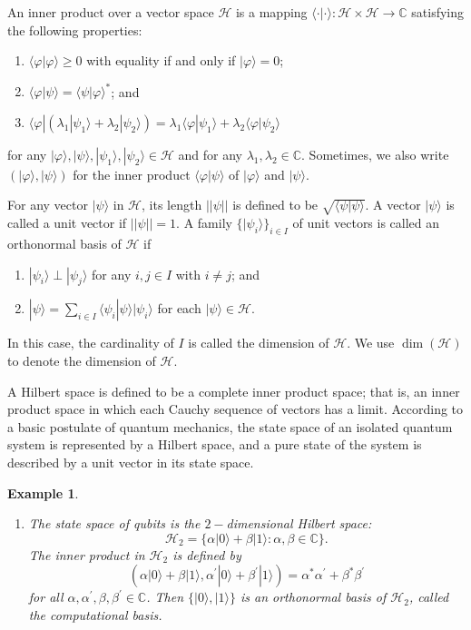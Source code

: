\documentclass[conference,compsoc, 10pt]{IEEEtran}
\newtheorem{example}{Example}[section]
\newcommand {\cH } {{\mathcal{H}}}
\begin{document}
\begin{appendices}
		An inner product over a vector space $\mathcal{H}$ is a mapping
		$\langle\cdot|\cdot\rangle:\mathcal{H}\times \mathcal{H}\rightarrow
		\mathbb{C}$ satisfying the following properties:
		\begin{enumerate}\item $\langle\varphi|\varphi\rangle\geq 0$ with
			equality if and only if $|\varphi\rangle =0$; \item
			$\langle\varphi|\psi\rangle=\langle\psi|\varphi\rangle^{\ast}$; and
			\item $\langle\varphi|(\lambda_1|\psi_1\rangle+\lambda_2|\psi_2\rangle)=
			\lambda_1\langle\varphi|\psi_1\rangle+\lambda_2\langle\varphi|\psi_2\rangle$\end{enumerate}
		for any $|\varphi\rangle, |\psi\rangle, |\psi_1\rangle,
		|\psi_2\rangle \in \mathcal{H}$ and for any $\lambda_1,\lambda_2\in
		\mathbb{C}$. Sometimes, we also write
		$(|\varphi\rangle,|\psi\rangle)$ for the inner product
		$\langle\varphi|\psi\rangle$ of $|\varphi\rangle$ and
		$|\psi\rangle$.
		
		For any vector $|\psi\rangle$ in $\mathcal{H}$, its length
		$||\psi||$ is defined to be $\sqrt{\langle\psi|\psi\rangle}$. A
		vector $|\psi\rangle$ is called a unit vector if $||\psi||=1$.
		A family $\{|\psi_i\rangle\}_{i\in I}$ of
		unit vectors is called an orthonormal basis of $\mathcal{H}$ if
		\begin{enumerate}\item $|\psi_i\rangle\perp |\psi_j\rangle$ for any $i,j\in I$ with $i\neq j$; and \item
			$|\psi\rangle=\sum_{i\in I}\langle\psi_i|\psi\rangle|\psi_i\rangle$
			for each $|\psi\rangle\in\mathcal{H}.$\end{enumerate} In this case,
		the cardinality of $I$ is called the dimension of $\mathcal{H}$. We use $\dim(\cH)$ to denote the dimension of $\cH.$
		
		A Hilbert space is defined to be a complete inner product space;
		that is, an inner product space in which each Cauchy sequence of
		vectors has a limit. According to a basic postulate of quantum
		mechanics, the state space of an isolated quantum system is
		represented by a Hilbert space, and a pure state of the system is
		described by a unit vector in its state space.
		
		\begin{example}\label{ex-qub}\begin{enumerate}\item The state space of qubits is the
				$2-$dimensional Hilbert space:
				$$\mathcal{H}_2=\{\alpha|0\rangle+\beta|1\rangle:\alpha,\beta\in\mathbb{C}\}.$$
				The inner product in $\mathcal{H}_2$ is defined by $$(\alpha
				|0\rangle+\beta |1\rangle,\alpha^{\prime} |0\rangle+\beta^{\prime}
				|1\rangle)=\alpha^{\ast}\alpha^{\prime}+\beta^{\ast}\beta^{\prime}
				$$ for all
				$\alpha,\alpha^{\prime},\beta,\beta^{\prime}\in\mathbb{C}$. Then
				$\{|0\rangle, |1\rangle\}$ is an orthonormal basis of
				$\mathcal{H}_2$, called the computational basis.
				

\end{enumerate}
\end{example}
\end{appendices}
\end{document}
